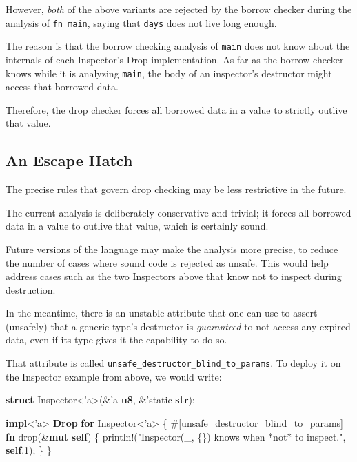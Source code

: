 \documentclass[a4paper,]{book}
\newenvironment{Shaded}{\begin{snugshade}}{\end{snugshade}}
\newcommand{\KeywordTok}[1]{\textcolor[rgb]{0.13,0.29,0.53}{\textbf{{#1}}}}
\newcommand{\DecValTok}[1]{\textcolor[rgb]{0.00,0.00,0.81}{{#1}}}
\newcommand{\StringTok}[1]{\textcolor[rgb]{0.31,0.60,0.02}{{#1}}}
\newcommand{\OtherTok}[1]{\textcolor[rgb]{0.56,0.35,0.01}{{#1}}}
\newcommand{\NormalTok}[1]{{#1}}
\begin{document}
However, \emph{both} of the above variants are rejected by the borrow
checker during the analysis of \texttt{fn\ main}, saying that
\texttt{days} does not live long enough.

The reason is that the borrow checking analysis of \texttt{main} does
not know about the internals of each Inspector's Drop implementation. As
far as the borrow checker knows while it is analyzing \texttt{main}, the
body of an inspector's destructor might access that borrowed data.

Therefore, the drop checker forces all borrowed data in a value to
strictly outlive that value.

\subsection{An Escape Hatch}\label{an-escape-hatch}

The precise rules that govern drop checking may be less restrictive in
the future.

The current analysis is deliberately conservative and trivial; it forces
all borrowed data in a value to outlive that value, which is certainly
sound.

Future versions of the language may make the analysis more precise, to
reduce the number of cases where sound code is rejected as unsafe. This
would help address cases such as the two Inspectors above that know not
to inspect during destruction.

In the meantime, there is an unstable attribute that one can use to
assert (unsafely) that a generic type's destructor is \emph{guaranteed}
to not access any expired data, even if its type gives it the capability
to do so.

That attribute is called \texttt{unsafe\_destructor\_blind\_to\_params}.
To deploy it on the Inspector example from above, we would write:

\begin{Shaded}
\begin{Highlighting}[]
\KeywordTok{struct} \NormalTok{Inspector<}\OtherTok{'a}\NormalTok{>(&}\OtherTok{'a} \KeywordTok{u8}\NormalTok{, &}\OtherTok{'static} \KeywordTok{str}\NormalTok{);}

\KeywordTok{impl}\NormalTok{<}\OtherTok{'a}\NormalTok{> }\KeywordTok{Drop} \KeywordTok{for} \NormalTok{Inspector<}\OtherTok{'a}\NormalTok{> \{}
    \OtherTok{#[}\NormalTok{unsafe_destructor_blind_to_params}\OtherTok{]}
    \KeywordTok{fn} \NormalTok{drop(&}\KeywordTok{mut} \KeywordTok{self}\NormalTok{) \{}
        \OtherTok{println!}\NormalTok{(}\StringTok{"Inspector(_, \{\}) knows when *not* to inspect."}\NormalTok{, }\KeywordTok{self}\NormalTok{.}\DecValTok{1}\NormalTok{);}
    \NormalTok{\}}
\NormalTok{\}}
\end{Highlighting}
\end{Shaded}
\end{document}
